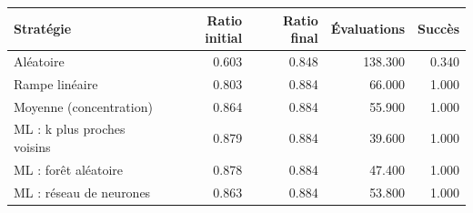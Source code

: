 \begin{tabular}{lrrrr}
\toprule
Stratégie & Ratio initial & Ratio final & Évaluations & Succès \\
\midrule
Aléatoire & 0.603 & 0.848 & 138.300 & 0.340 \\
Rampe linéaire & 0.803 & 0.884 & 66.000 & 1.000 \\
Moyenne (concentration) & 0.864 & 0.884 & 55.900 & 1.000 \\
ML : k plus proches voisins & 0.879 & 0.884 & 39.600 & 1.000 \\
ML : forêt aléatoire & 0.878 & 0.884 & 47.400 & 1.000 \\
ML : réseau de neurones & 0.863 & 0.884 & 53.800 & 1.000 \\
\bottomrule
\end{tabular}
